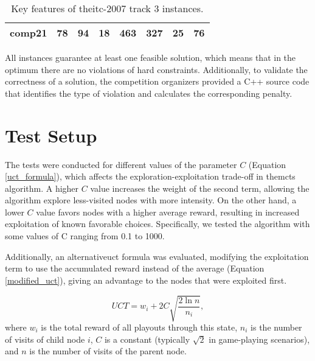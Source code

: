 \begin{table}[h!]
\begin{center}
\begin{tabular}{ |c|c|c|c|c|c|c|c| }
comp21                                    & 78                                         & 94                                       & 18                                     & 463                                          & 327                                       & 25                                       & 76 					\\
\hline                                      
\end{tabular}
\caption{Key features of the\ac{itc-2007} track 3 instances.}
\label{itc_instance_features}
\end{center}
\end{table}

All instances guarantee at least one feasible solution, which means that in the optimum there are no violations of hard constraints. Additionally, to validate the correctness of a solution, the competition organizers provided a C++ source code that identifies the type of violation and calculates the corresponding penalty.

\section{Test Setup}

The tests were conducted for different values of the parameter \(C\) (Equation \ref{uct_formula}), which affects the exploration-exploitation trade-off in the\ac{mcts} algorithm. A higher \(C\) value increases the weight of the second term, allowing the algorithm explore less-visited nodes with more intensity. On the other hand, a lower \(C\) value favors nodes with a higher average reward, resulting in increased exploitation of known favorable choices. Specifically, we tested the algorithm with some values of C ranging from 0.1 to 1000.

Additionally, an alternative\ac{uct} formula was evaluated, modifying the exploitation term to use the accumulated reward instead of the average (Equation \ref{modified_uct}), giving an advantage to the nodes that were exploited first.

\begin{equation}
UCT = w_i + 2C\sqrt{\frac{2\ln{n}}{n_i}},\label{modified_uct}
\end{equation} where \(w_i\) is the total reward of all playouts through this state, \(n_i\) is the number of visits of child node \(i\), \(C\) is a constant (typically \(\sqrt{2}\) in game-playing scenarios), and \(n\) is the number of visits of the parent node.

